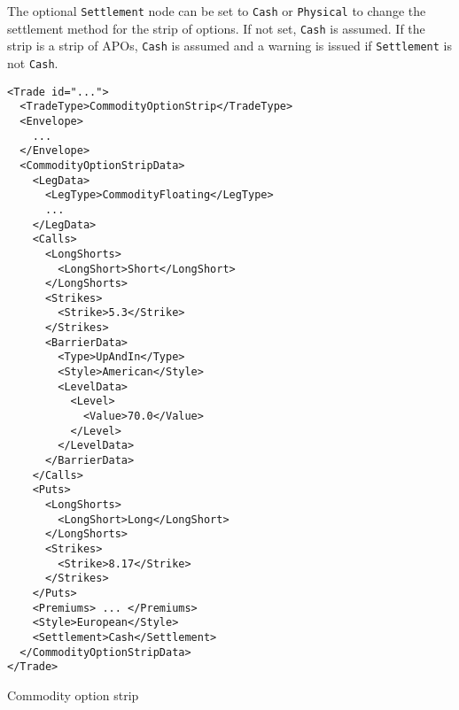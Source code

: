 The optional \lstinline!Settlement! node can be set to \lstinline!Cash! or \lstinline!Physical! to change the settlement method for the strip of options. If not set, \lstinline!Cash! is assumed. If the strip is a strip of APOs, \lstinline!Cash! is assumed and a warning is issued if \lstinline!Settlement! is not \lstinline!Cash!.

\begin{listing}[h!]
\begin{verbatim}
<Trade id="...">
  <TradeType>CommodityOptionStrip</TradeType>
  <Envelope>
    ...
  </Envelope>
  <CommodityOptionStripData>
    <LegData>
      <LegType>CommodityFloating</LegType>
      ...
    </LegData>
    <Calls>
      <LongShorts>
        <LongShort>Short</LongShort>
      </LongShorts>
      <Strikes>
        <Strike>5.3</Strike>
      </Strikes>
      <BarrierData>
        <Type>UpAndIn</Type>
        <Style>American</Style>
        <LevelData>
          <Level>
            <Value>70.0</Value>
          </Level>
        </LevelData>
      </BarrierData>
    </Calls>
    <Puts>
      <LongShorts>
        <LongShort>Long</LongShort>
      </LongShorts>
      <Strikes>
        <Strike>8.17</Strike>
      </Strikes>
    </Puts>
    <Premiums> ... </Premiums>
    <Style>European</Style>
    <Settlement>Cash</Settlement>
  </CommodityOptionStripData>
</Trade>
\end{verbatim}
\caption{Commodity option strip}
\label{lst:commodity_option_strip}
\end{listing}
